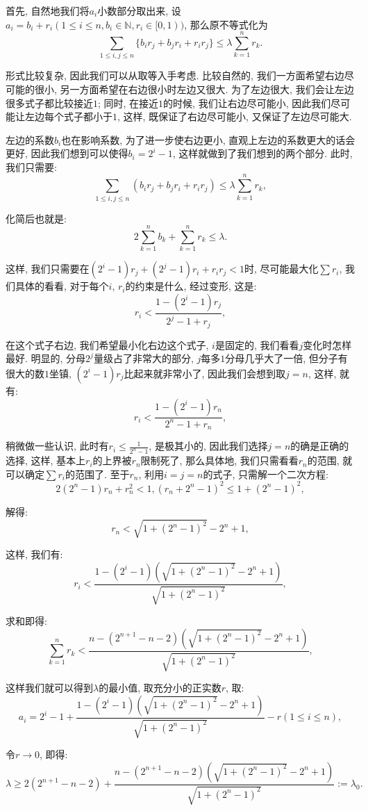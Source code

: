 \documentclass[lang=cn,12pt,thmcnt=section]{elegantbook}
\begin{document}
\begin{analysis}
首先, 自然地我们将$a_i$小数部分取出来, 设$a_i=b_i+r_i(1\le i\le n,b_i\in \mathbb{N},r_i\in [0,1))$, 那么原不等式化为
\[
\sum_{1\le i,j\le n}\{b_ir_j+b_jr_i+r_ir_j\}\le  \lambda\sum_{k=1}^n r_k.
\]

形式比较复杂, 因此我们可以从取等入手考虑. 比较自然的, 我们一方面希望右边尽可能的很小, 另一方面希望在右边很小时左边又很大. 为了左边很大, 我们会让左边很多式子都比较接近$1$; 同时, 在接近$1$的时候, 我们让右边尽可能小, 因此我们尽可能让左边每个式子都小于$1$, 这样, 既保证了右边尽可能小, 又保证了左边尽可能大. 

左边的系数$b_i$也在影响系数, 为了进一步使右边更小, 直观上左边的系数更大的话会更好, 因此我们想到可以使得$b_i=2^i-1$, 这样就做到了我们想到的两个部分. 此时, 我们只需要: 
\[
\sum_{1\le i,j\le n}(b_ir_j+b_jr_i+r_ir_j)\le  \lambda\sum_{k=1}^n r_k,
\]

化简后也就是: 
\[
2\sum_{k=1}^n b_k+\sum_{k=1}^n r_k \le \lambda.
\]

这样, 我们只需要在$(2^i-1)r_j+(2^j-1)r_i+r_ir_j<1$时, 尽可能最大化$\sum r_i$, 我们具体的看看, 对于每个$i$, $r_i$的约束是什么, 经过变形, 这是: 
\[
r_i<\frac{1-(2^i-1)r_j}{2^j-1+r_j},
\]

在这个式子右边, 我们希望最小化右边这个式子, $i$是固定的, 我们看看$j$变化时怎样最好. 明显的, 分母$2^j$量级占了非常大的部分, $j$每多$1$分母几乎大了一倍, 但分子有很大的数$1$坐镇, $(2^i-1)r_j$比起来就非常小了, 因此我们会想到取$j=n$, 这样, 就有: 
\[
r_i<\frac{1-(2^i-1)r_n}{2^n-1+r_n},
\]

稍微做一些认识, 此时有$r_i\le \frac{1}{2^n-1}$, 是极其小的, 因此我们选择$j=n$的确是正确的选择, 这样, 基本上$r_i$的上界被$r_n$限制死了, 那么具体地, 我们只需看看$r_n$的范围, 就可以确定$\sum r_i$的范围了. 至于$r_n$, 利用$i=j=n$的式子, 只需解一个二次方程: 
\[
2(2^n-1)r_n+r_n^2<1, (r_n+2^n-1)^2\le 1+(2^n-1)^2,
\]

解得: 
\[
r_n< \sqrt{1+(2^n-1)^2}-2^n+1,
\]

这样, 我们有: 
\[
r_i< \frac{1-(2^i-1)(\sqrt{1+(2^n-1)^2}-2^n+1)}{\sqrt{1+(2^n-1)^2}},
\]

求和即得: 
\[
\sum_{k=1}^n r_k<\frac{n-(2^{n+1}-n-2)(\sqrt{1+(2^n-1)^2}-2^n+1)}{\sqrt{1+(2^n-1)^2}},
\]

这样我们就可以得到$\lambda$的最小值, 取充分小的正实数$r$, 取: 
\[
a_i=2^i-1+\frac{1-(2^i-1)(\sqrt{1+(2^n-1)^2}-2^n+1)}{\sqrt{1+(2^n-1)^2}}-r(1\le i\le n),
\]

令$r\to 0$, 即得: 
\[
\lambda\ge 2(2^{n+1}-n-2)+\frac{n-(2^{n+1}-n-2)(\sqrt{1+(2^n-1)^2}-2^n+1)}{\sqrt{1+(2^n-1)^2}}:=\lambda_0.
\]


\end{analysis}
\end{document}
